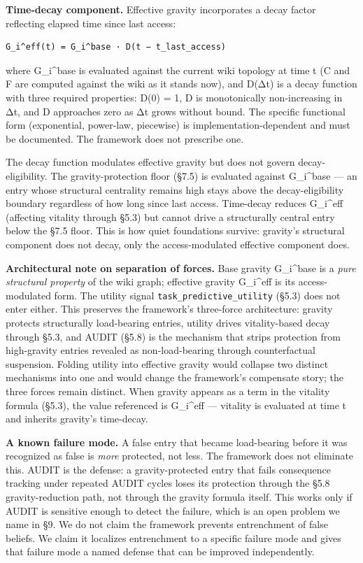 \documentclass[
  11pt,
]{article}
\begin{document}
\textbf{Time-decay component.} Effective gravity incorporates a decay
factor reflecting elapsed time since last access:

\begin{verbatim}
G_i^eff(t) = G_i^base · D(t − t_last_access)
\end{verbatim}

where G\_i\^{}base is evaluated against the current wiki topology at
time t (C and F are computed against the wiki as it stands now), and
D(Δt) is a decay function with three required properties: D(0) = 1, D is
monotonically non-increasing in Δt, and D approaches zero as Δt grows
without bound. The specific functional form (exponential, power-law,
piecewise) is implementation-dependent and must be documented. The
framework does not prescribe one.

The decay function modulates effective gravity but does not govern
decay-eligibility. The gravity-protection floor (§7.5) is evaluated
against G\_i\^{}base --- an entry whose structural centrality remains
high stays above the decay-eligibility boundary regardless of how long
since last access. Time-decay reduces G\_i\^{}eff (affecting vitality
through §5.3) but cannot drive a structurally central entry below the
§7.5 floor. This is how quiet foundations survive: gravity's structural
component does not decay, only the access-modulated effective component
does.

\textbf{Architectural note on separation of forces.} Base gravity
G\_i\^{}base is a \emph{pure structural property} of the wiki graph;
effective gravity G\_i\^{}eff is its access-modulated form. The utility
signal \texttt{task\_predictive\_utility} (§5.3) does not enter either.
This preserves the framework's three-force architecture: gravity
protects structurally load-bearing entries, utility drives
vitality-based decay through §5.3, and AUDIT (§5.8) is the mechanism
that strips protection from high-gravity entries revealed as
non-load-bearing through counterfactual suspension. Folding utility into
effective gravity would collapse two distinct mechanisms into one and
would change the framework's compensate story; the three forces remain
distinct. When gravity appears as a term in the vitality formula (§5.3),
the value referenced is G\_i\^{}eff --- vitality is evaluated at time t
and inherits gravity's time-decay.

\textbf{A known failure mode.} A false entry that became load-bearing
before it was recognized as false is \emph{more} protected, not less.
The framework does not eliminate this. AUDIT is the defense: a
gravity-protected entry that fails consequence tracking under repeated
AUDIT cycles loses its protection through the §5.8 gravity-reduction
path, not through the gravity formula itself. This works only if AUDIT
is sensitive enough to detect the failure, which is an open problem we
name in §9. We do not claim the framework prevents entrenchment of false
beliefs. We claim it localizes entrenchment to a specific failure mode
and gives that failure mode a named defense that can be improved
independently.
\end{document}
